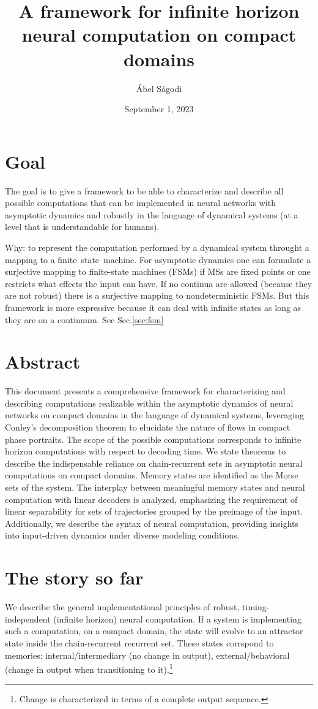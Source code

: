 \documentclass{scrartcl}
\title{A framework for infinite horizon neural computation on compact domains}
\author{\'Abel S\'agodi}
\date{September 1, 2023}
\theoremstyle{definition}
\theoremstyle{remark}
\begin{document}
\maketitle


\section*{Goal}
The goal is to give a framework to be able to characterize and describe all possible computations that can be implemented in neural networks with asymptotic dynamics and robustly in the language of dynamical systems (at a level that is understandable for humans).

Why: to represent the computation performed by a dynamical system throught a mapping to a finite state machine.
For asymptotic dynamics one can formulate a surjective mapping to finite-state machines (FSMs) if MSs are fixed points or one restricts what effects the input can have.
If no continua are allowed (because they are not robust) there is a surjective mapping to nondeterministic FSMs. 
But this framework is more expressive because it can deal with infinite states as long as they are on a continuum.
See Sec.\ref{sec:fsm}

\section*{Abstract}
This document presents a comprehensive framework for characterizing and describing computations realizable within the asymptotic dynamics of neural networks on compact domains in the language of dynamical systems,  leveraging Conley's decomposition theorem to elucidate the nature of flows in compact phase portraits. The scope of the possible computations corresponds to infinite horizon computations with respect to decoding time. We state theorems to describe the indispensable reliance on chain-recurrent sets in asymptotic neural computations on compact domains. Memory states are identified as the Morse sets of the system. The interplay between meaningful memory states and neural computation with linear decoders is analyzed, emphasizing the requirement of linear separability for sets of trajectories grouped by the preimage of the input. 
Additionally, we describe the syntax of neural computation, providing insights into input-driven dynamics under diverse modeling conditions. 



\newpage
\section*{The story so far}
We describe the general implementational principles of robust, timing-independent (infinite horizon) neural computation.
If a system is implementing such a computation, on a compact domain, the state will evolve to an attractor state inside the chain-recurrent recurrent set.
These states corrspond to memories: internal/intermediary (no change in output), external/behavioral (change in output when transitioning to it).\footnote{Change is characterized in terms of a complete output sequence.}
\end{document}
